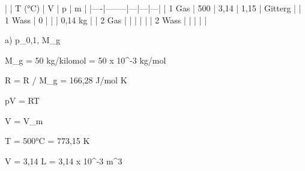 |    | T (°C) | V | p | m |
|----|--------|---|---|---|
| 1 Gas | 500 | 3,14 | 1,15 | Gitterg |
| 1 Wass | 0 |   |   | 0,14 kg |
| 2 Gas |   |   |   |   |
| 2 Wass |   |   |   |   |

a) p_0,1, M_g

M_g = 50 kg/kilomol = 50 x 10^-3 kg/mol

R = R / M_g = 166,28 J/mol K

pV = RT

V = V_m

T = 500°C = 773,15 K

V = 3,14 L = 3,14 x 10^-3 m^3